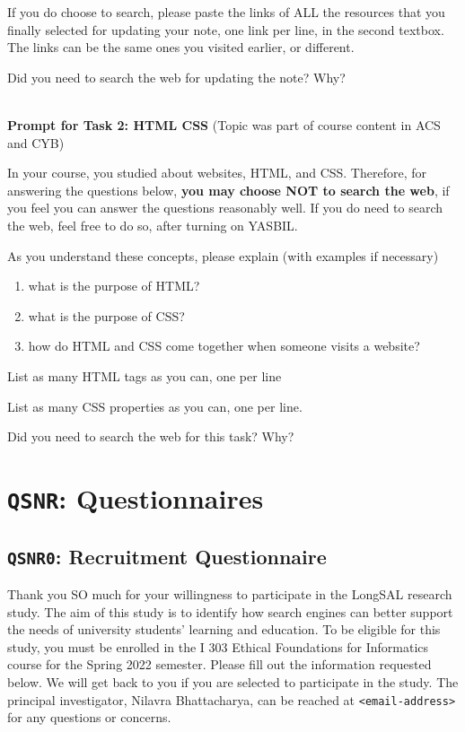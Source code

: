 \documentclass[letterpaper, nobind]{templates/ociamthesis}
\begin{document}
If you do choose to search, please paste the links of ALL the resources
that you finally selected for updating your note, one link per line, in
the second textbox. The links can be the same ones you visited earlier,
or different.

Did you need to search the web for updating the note? Why?

~\\
\textbf{Prompt for Task 2: HTML CSS} (Topic was part of course content in ACS and CYB)

In your course, you studied about websites, HTML, and CSS. Therefore,
for answering the questions below, \textbf{you may choose NOT to search the
web}, if you feel you can answer the questions reasonably well. If you
do need to search the web, feel free to do so, after turning on YASBIL.

As you understand these concepts, please explain (with examples if
necessary)

\begin{enumerate}
\def\labelenumi{\arabic{enumi}.}
\item
  what is the purpose of HTML?
\item
  what is the purpose of CSS?
\item
  how do HTML and CSS come together when someone visits a website?
\end{enumerate}

List as many HTML tags as you can, one per line

List as many CSS properties as you can, one per line.

Did you need to search the web for this task? Why?

\hypertarget{app-qsnr}{%
\chapter{\texorpdfstring{\texttt{QSNR}: Questionnaires}{QSNR: Questionnaires}}\label{app-qsnr}}

\hypertarget{app-qsnr0}{%
\section{\texorpdfstring{\texttt{QSNR0}: Recruitment Questionnaire}{QSNR0: Recruitment Questionnaire}}\label{app-qsnr0}}

Thank you SO much for your willingness to participate in the LongSAL research study. The aim of this study is to identify how search engines can better support the needs of university students' learning and education. To be eligible for this study, you must be enrolled in the I 303 Ethical Foundations for Informatics course for the Spring 2022 semester. Please fill out the information requested below. We will get back to you if you are selected to participate in the study. The principal investigator, Nilavra Bhattacharya, can be reached at \texttt{\textless{}email-address\textgreater{}} for any questions or concerns.
\end{document}
